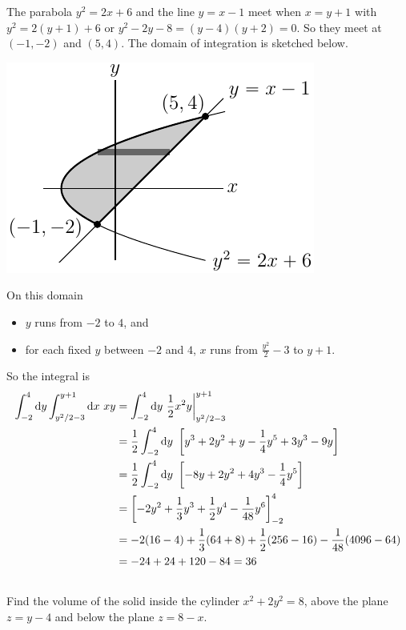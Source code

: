 \begin{solution}
The parabola $y^2=2x+6$ and the line $y=x-1$ meet when $x=y+1$
with $y^2=2(y+1)+6$ or $y^2-2y-8=(y-4)(y+2)=0$. So they meet at $(-1,-2)$ and $(5,4)$.
The domain of integration is sketched below. 
\begin{center}
     \includegraphics{fig/OE00AQ7.pdf}
\end{center}
On this domain
\begin{itemize}
\item
$y$ runs from $-2$ to $4$, and
\item
for each fixed $y$ between $-2$ and $4$, $x$ runs from $\frac{y^2}{2}-3$
to $y+1$.
\end{itemize}
So the integral is 
\begin{align*}
\int_{-2}^4\dee{y}\int_{y^2/2-3}^{y+1}\dee{x}\ xy
&=\int_{-2}^4\dee{y}\ \frac{1}{2} x^2y\bigg|_{y^2/2-3}^{y+1} \\
&=\frac{1}{2}\int_{-2}^4\dee{y}\ 
                  \left[y^3+2y^2+y-\frac{1}{4}y^5+3y^3-9y\right] \\
&=\frac{1}{2}\int_{-2}^4\dee{y}\ \left[-8y+2y^2+4y^3-\frac{1}{4}y^5\right] \\
&=\left[-2y^2+\frac{1}{3}y^3+\frac{1}{2}y^4-\frac{1}{48}y^6\right]_{-2}^4 \\
&=-2(16-4)+\frac{1}{3}(64+8)+\frac{1}{2}(256-16)
-\frac{1}{48}(4096-64)\cr
&=-24+24+120-84=36
\end{align*}
\end{solution}



\subsection*{\Application}

\begin{question}
Find the volume of the solid inside the cylinder $x^2+2y^2=8$, above
the plane $z=y-4$ and below the plane $z=8-x$.
\end{question}

